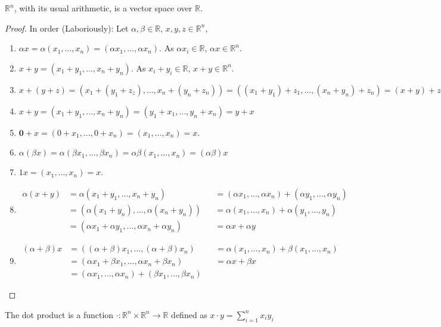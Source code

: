 \documentclass[crop=false,class=book]{standalone}
\begin{document}
\begin{theorem}
$\mathbb{R}^n$, with its usual arithmetic, is a vector space over $\mathbb{R}$.
\end{theorem}
\begin{proof}
In order (Laboriously): Let $\alpha, \beta \in \mathbb{R}$, $x,y,z\in \mathbb{R}^n$,
\begin{enumerate}
\item $\alpha x = \alpha(x_1,\hdots,x_n) = (\alpha x_1,\hdots, \alpha x_n)$. As $\alpha x_i \in \mathbb{R}$, $\alpha x \in \mathbb{R}^n$.
\item $x+y = (x_1+y_1,\hdots,x_n+y_n)$. As $x_i+y_i \in \mathbb{R}$, $x+y\in \mathbb{R}^n$.
\item $x+(y+z) = (x_1+(y_1+z_z),\hdots, x_n+(y_n+z_n)) = ((x_1+y_1)+z_1,\hdots, (x_n+y_n)+z_n) = (x+y)+z$
\item $x+y = (x_1+y_1,\hdots,x_n+y_n) = (y_1+x_1,\hdots, y_n+x_n)=y+x$
\item $\mathbf{0}+x = (0+x_1,\hdots, 0+x_n) = (x_1,\hdots, x_n) = x$.
\item $\alpha(\beta x) = \alpha(\beta x_1,\hdots, \beta x_n) = \alpha \beta (x_1,\hdots, x_n) = (\alpha \beta) x$
\item $1 x = (x_1,\hdots, x_n) = x$.
\item
    \begin{align*}
        \alpha(x+y) &= \alpha(x_1+y_1,\hdots, x_n+y_n) & &= (\alpha x_1, \hdots, \alpha x_n) + (\alpha y_1,\hdots, \alpha y_n)\\
        &= (\alpha(x_1+y_n),\hdots, \alpha(x_n+y_n)) & &= \alpha(x_1,\hdots, x_n)+\alpha(y_1,\hdots, y_n)\\
        &= (\alpha x_1+\alpha y_1,\hdots, \alpha x_n + \alpha y_n) & &= \alpha x + \alpha y
    \end{align*} 
\item
    \begin{align*}
        (\alpha + \beta)x &= ((\alpha+\beta)x_1,\hdots, (\alpha+\beta)x_n) & &= \alpha (x_1, \hdots, x_n)+\beta (x_1, \hdots, x_n)\\
        &= (\alpha x_1 + \beta x_1,\hdots, \alpha x_n + \beta x_n) & &= \alpha x+\beta x\\
        &= (\alpha x_1,\hdots, \alpha x_n) + (\beta x_1,\hdots, \beta x_n)
    \end{align*}
\end{enumerate}
\end{proof}
\begin{definition}
The dot product is a function $\cdot:\mathbb{R}^n \times \mathbb{R}^n \rightarrow \mathbb{R}$ defined as $x\cdot y = \sum_{i=1}^{n} x_iy_i$
\end{definition}
\end{document}
